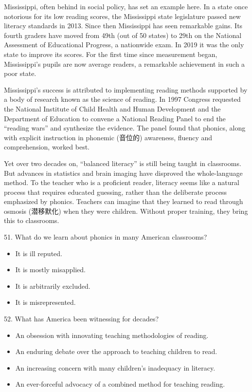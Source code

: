 \documentclass[UTF8,11pt]{ctexart}
\begin{document}
Mississippi, often behind in social policy, has set an example here. In a state once notorious for its low reading scores, the Mississippi state legislature passed new literacy standards in 2013. Since then Mississippi has seen remarkable gains. Its fourth graders have moved from 49th (out of 50 states) to 29th on the National Assessment of Educational Progress, a nationwide exam. In 2019 it was the only state to improve its scores. For the first time since measurement began, Mississippi’s pupils are now average readers, a remarkable achievement in such a poor state.


Mississippi’s success is attributed to implementing reading methods supported by a body of research known as the science of reading. In 1997 Congress requested the National Institute of Child Health and Human Development and the Department of Education to convene a National Reading Panel to end the “reading wars” and synthesize the evidence. The panel found that phonics, along with explicit instruction in phonemic (音位的) awareness, fluency and comprehension, worked best.


Yet over two decades on, “balanced literacy” is still being taught in classrooms. But advances in statistics and brain imaging have disproved the whole-language method. To the teacher who is a proficient reader, literacy seems like a natural process that requires educated guessing, rather than the deliberate process emphasized by phonics. Teachers can imagine that they learned to read through osmosis (潜移默化) when they were children. Without proper training, they bring this to classrooms.


51. What do we learn about phonics in many American classrooms?


\begin{itemize}[leftmargin=2em,itemsep=.2em,topsep=.4em]\item[A.] It is ill reputed.
\item[B.] It is mostly misapplied.
\item[C.] It is arbitrarily excluded.
\item[D.] It is misrepresented.
\end{itemize}

52. What has America been witnessing for decades?


\begin{itemize}[leftmargin=2em,itemsep=.2em,topsep=.4em]\item[A.] An obsession with innovating teaching methodologies of reading.
\item[B.] An enduring debate over the approach to teaching children to read.
\item[C.] An increasing concern with many children’s inadequacy in literacy.
\item[D.] An ever-forceful advocacy of a combined method for teaching reading.
\end{itemize}
\end{document}
